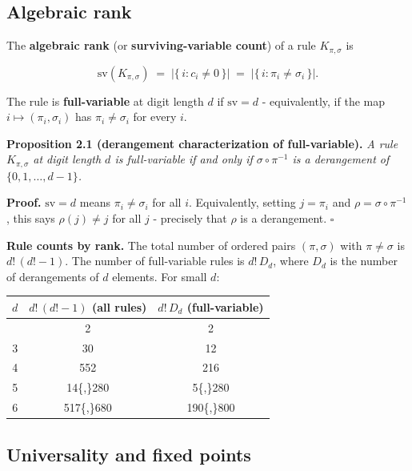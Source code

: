 \documentclass[11pt,letterpaper]{article}
\theoremstyle{paperstyle}
\theoremstyle{paperstyledef}
\theoremstyle{paperstylerem}
\begin{document}
\hypertarget{algebraic-rank}{%
\subsection{Algebraic rank}\label{algebraic-rank}}

The \textbf{algebraic rank} (or \textbf{surviving-variable count}) of a
rule \(K_{\pi, \sigma}\) is

\[\mathrm{sv}(K_{\pi, \sigma}) \;=\; \bigl|\{\,i : c_i \neq 0\,\}\bigr| \;=\; \bigl|\{\,i : \pi_i \neq \sigma_i\,\}\bigr|.\]

The rule is \textbf{full-variable} at digit length \(d\) if
\(\mathrm{sv} = d\) - equivalently, if the map
\(i \mapsto (\pi_i, \sigma_i)\) has \(\pi_i \neq \sigma_i\) for every
\(i\).

\textbf{Proposition 2.1 (derangement characterization of
full-variable).} \emph{A rule \(K_{\pi, \sigma}\) at digit length \(d\)
is full-variable if and only if \(\sigma \circ \pi^{-1}\) is a
derangement of \(\{0, 1, \ldots, d-1\}\).}

\textbf{Proof.} \(\mathrm{sv} = d\) means \(\pi_i \neq \sigma_i\) for
all \(i\). Equivalently, setting \(j = \pi_i\) and
\(\rho = \sigma \circ \pi^{-1}\), this says \(\rho(j) \neq j\) for all
\(j\) - precisely that \(\rho\) is a derangement. \(\square\)

\textbf{Rule counts by rank.} The total number of ordered pairs
\((\pi, \sigma)\) with \(\pi \neq \sigma\) is \(d! \, (d! - 1)\). The
number of full-variable rules is \(d! \, D_d\), where \(D_d\) is the
number of derangements of \(d\) elements. For small \(d\):

\begin{longtable}[]{@{}ccc@{}}
\toprule\noalign{}
\(d\) & \(d! \, (d! - 1)\) (all rules) & \(d! \, D_d\)
(full-variable) \\
\midrule\noalign{}
\endhead
\bottomrule\noalign{}
\endlastfoot
2 & 2 & 2 \\
3 & 30 & 12 \\
4 & 552 & 216 \\
5 & 14\{,\}280 & 5\{,\}280 \\
6 & 517\{,\}680 & 190\{,\}800 \\
\end{longtable}

\hypertarget{universality-and-fixed-points}{%
\subsection{Universality and fixed points}\label{universality-and-fixed-points}}
\end{document}
